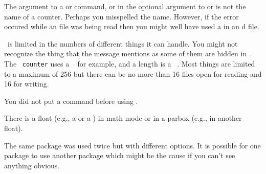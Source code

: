 \begin{plainlist}
    The argument to a \cmd{\setcounter} or \cmd{\addtocounter}
command, or in the optional argument to \cmd{\newcounter}
or \cmd{\newtheorem} is not the name of a counter. Perhaps you 
misspelled the name.
However, if the error occured while an  file was being read
then you might well have used a \cmd{\newcounter} in an \cmd{}d file.




\item[]

    \tx\ is limited in the numbers of different things it can handle. You 
might not recognize the thing that the message mentions as some of them are
hidden in \ltx. The \ltx\ \texttt{counter} uses a \tx\ \cmd{\count} for
example, and a length is a \tx\ \cmd{\skip}. Most things are limited to a 
maximum of 256 but there can be no more than 16 files open for reading
and 16 for writing.

\item[]

You did not put a \cmd{\title} command before using \cmd{\maketitle}.


\item[]

    There is a float (e.g., a  or a \cmd{\marginpar})
in math mode or in a parbox (e.g., in another float).





\item[]

    The same package was used twice but with different options. It is possible
for one package to use another package which might be the cause if you 
can't see anything obvious.


\end{plainlist}
